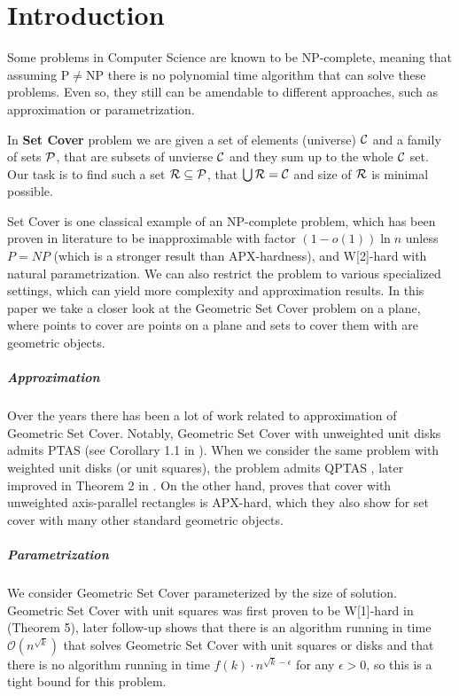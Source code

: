 \chapter{Introduction}

Some problems in Computer Science are known to be NP-complete,
meaning that assuming P$\neq$NP there is no polynomial time
algorithm that can solve these problems.
Even so, they still can be amendable to different approaches,
such as approximation or parametrization.

\begin{defi}
In \textbf{Set Cover} problem we are given a set of elements (universe)
$\mathcal{C}$ and a family of sets $\mathcal{P}$, that are subsets of unvierse $\mathcal{C}$
and they sum up to the whole $\mathcal{C}$ set.
Our task is to find such a set $\mathcal{R} \subseteq \mathcal{P}$,
that $\bigcup \mathcal{R} = \mathcal{C}$ and size of $\mathcal{R}$ is minimal possible.
\end{defi}

Set Cover is one classical example of an NP-complete problem,
which has been proven
in literature to be
inapproximable with factor $(1-o(1))\ln n$ unless $P = NP$
(which is a stronger result than APX-hardness),
and W[2]-hard with natural parametrization.
We can also restrict the problem to various specialized settings,
which can yield more complexity and approximation results.
In this paper we take a closer look at the Geometric Set Cover problem
on a plane, where points to cover are points on a plane
and sets to cover them with are geometric objects.

\paragraph{Approximation}
Over the years there has been a lot of work related to approximation
of Geometric Set Cover. Notably,
Geometric Set Cover with unweighted unit disks admits PTAS (see
Corollary 1.1 in \cite{unit_disks}). When we consider the same problem
with weighted unit disks (or unit squares), the problem admits QPTAS
\cite{settling_apx_hardness}, later improved in
Theorem 2 in \cite{voronoi_true}.
On the other hand, \cite{rectangles_apx_hard} 
proves that cover with unweighted axis-parallel rectangles
is APX-hard, which they also show for set cover with many other
standard geometric objects.

\paragraph{Parametrization}
We consider Geometric Set Cover 
parameterized by the size of solution.
Geometric Set Cover with unit squares was first proven to be W[1]-hard 
in \cite{marx05} (Theorem 5), later follow-up \cite{voronoi}
shows that there is an algorithm running in time $\mathcal{O}(n^{\sqrt{k}})$
that solves Geometric Set Cover with unit squares or disks
and that there is no algorithm running in time $f(k) \cdot n^{\sqrt{k}-\epsilon}$
for any $\epsilon > 0$, so this is a tight bound for this problem.

